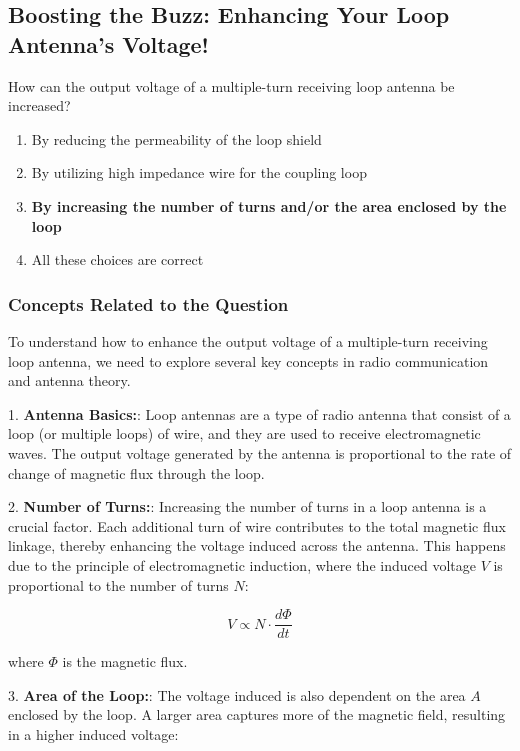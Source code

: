 \subsection{Boosting the Buzz: Enhancing Your Loop Antenna's Voltage!}

\begin{tcolorbox}[colback=gray!10, colframe=black, title=E9H10] How can the output voltage of a multiple-turn receiving loop antenna be increased?
\begin{enumerate}[label=\Alph*.]
    \item By reducing the permeability of the loop shield
    \item By utilizing high impedance wire for the coupling loop
    \item \textbf{By increasing the number of turns and/or the area enclosed by the loop}
    \item All these choices are correct
\end{enumerate} \end{tcolorbox}

\subsubsection*{Concepts Related to the Question}

To understand how to enhance the output voltage of a multiple-turn receiving loop antenna, we need to explore several key concepts in radio communication and antenna theory.

1. \textbf{Antenna Basics:}: Loop antennas are a type of radio antenna that consist of a loop (or multiple loops) of wire, and they are used to receive electromagnetic waves. The output voltage generated by the antenna is proportional to the rate of change of magnetic flux through the loop.

2. \textbf{Number of Turns:}: Increasing the number of turns in a loop antenna is a crucial factor. Each additional turn of wire contributes to the total magnetic flux linkage, thereby enhancing the voltage induced across the antenna. This happens due to the principle of electromagnetic induction, where the induced voltage \(V\) is proportional to the number of turns \(N\):

   \[
   V \propto N \cdot \frac{d\Phi}{dt}
   \]
   
   where \(\Phi\) is the magnetic flux.

3. \textbf{Area of the Loop:}: The voltage induced is also dependent on the area \(A\) enclosed by the loop. A larger area captures more of the magnetic field, resulting in a higher induced voltage:

